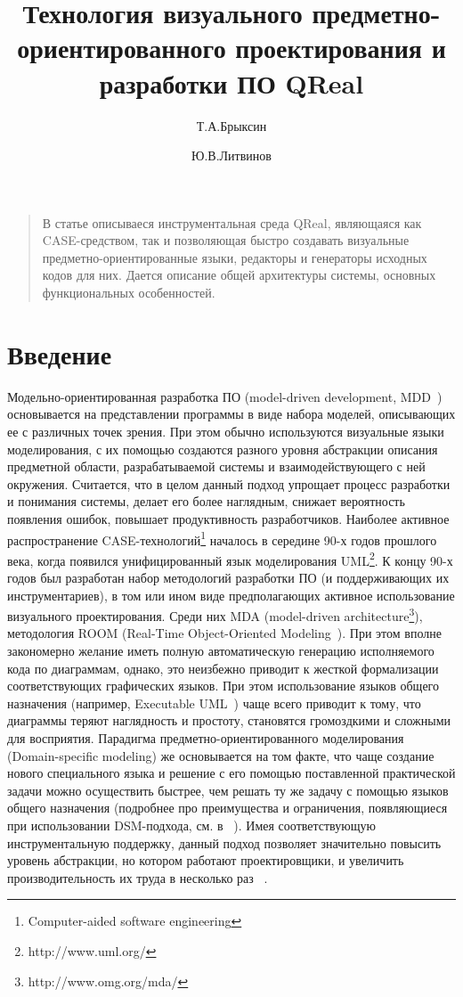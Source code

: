 \documentclass[a4paper]{article}
\title{Технология визуального предметно-ориентированного проектирования и разработки ПО QReal}
\author{Т.А.Брыксин \and Ю.В.Литвинов}
\date{}
\begin{document}
\maketitle
\thispagestyle{empty}

\begin{quote}
\small\noindent
В статье описываеся инструментальная среда QReal, являющаяся как CASE-средством, так и позволяющая быстро создавать визуальные предметно-ориентированные языки, редакторы и генераторы исходных кодов для них. Дается описание общей архитектуры системы, основных функциональных особенностей. 
\end{quote}

\section*{Введение}

Модельно-ориентированная разработка ПО (model-driven development, MDD~\cite{mdd}) основывается на представлении программы в виде набора моделей, описывающих ее с различных точек зрения. При этом обычно используются визуальные языки моделирования, с их помощью создаются разного уровня абстракции описания предметной области, разрабатываемой системы и взаимодействующего с ней окружения. Считается, что в целом данный подход упрощает процесс разработки и понимания системы, делает его более наглядным, снижает вероятность появления ошибок, повышает продуктивность разработчиков. Наиболее активное распространение CASE-технологий\footnote{Computer-aided software engineering}  началось в середине 90-х годов прошлого века, когда появился унифицированный язык моделирования UML\footnote{http://www.uml.org/}. К концу 90-х годов был разработан набор методологий разработки ПО (и поддерживающих их инструментариев), в том или ином виде предполагающих активное использование визуального проектирования. Среди них MDA (model-driven architecture\footnote{http://www.omg.org/mda/}), методология ROOM (Real-Time Object-Oriented Modeling~\cite{room}). При этом вполне закономерно желание иметь полную автоматическую генерацию исполняемого кода по диаграммам, однако, это неизбежно приводит к жесткой формализации соответствующих графических языков. При этом использование языков общего назначения (например, Executable UML~\cite{xuml}) чаще всего приводит к тому, что диаграммы теряют наглядность и простоту, становятся громоздкими и сложными для восприятия. Парадигма предметно-ориентированного моделирования (Domain-specific modeling) же основывается на том факте, что чаще создание нового специального языка и решение с его помощью поставленной практической задачи можно осуществить быстрее, чем решать ту же задачу с помощью языков общего назначения (подробнее про преимущества и ограничения, появляющиеся при использовании DSM-подхода, см. в ~\cite{theBook}). Имея соответствующую инструментальную поддержку, данный подход позволяет значительно повысить уровень абстракции, но котором работают проектировщики, и увеличить производительность их труда в несколько раз ~\cite{dsm01, dsm02, dsm03}.
\end{document}
